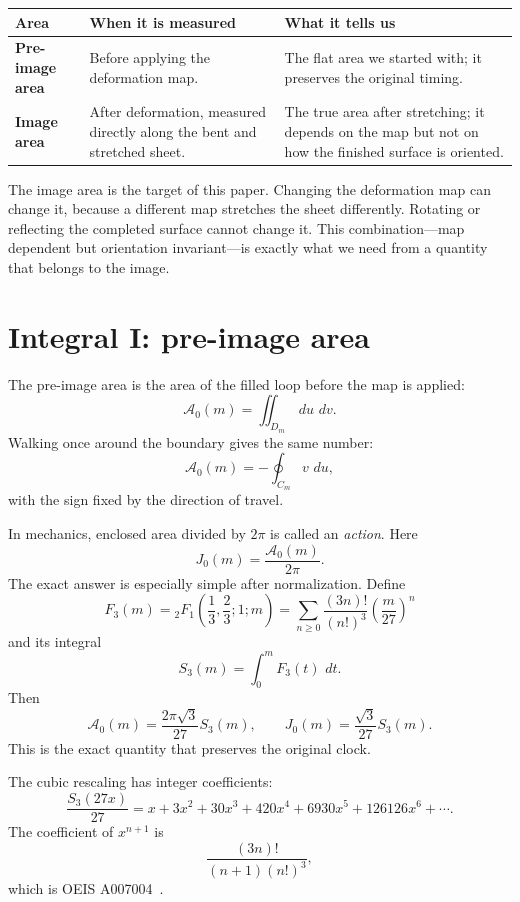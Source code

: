 \documentclass[11pt]{article}
\newcommand{\dd}{\,d}
\begin{document}
\begin{center}
\renewcommand{\arraystretch}{1.25}
\begin{tabularx}{0.98\textwidth}{>{\bfseries}p{}X X}
\toprule
Area & When it is measured & What it tells us\\
\midrule
Pre-image area
& Before applying the deformation map.
& The flat area we started with; it preserves the original timing.\\
Image area
& After deformation, measured directly along the bent and stretched sheet.
& The true area after stretching; it depends on the map but not on how the finished surface is oriented.\\
\bottomrule
\end{tabularx}
\end{center}

The image area is the target of this paper. Changing the deformation map can
change it, because a different map stretches the sheet differently. Rotating
or reflecting the completed surface cannot change it. This combination---map
dependent but orientation invariant---is exactly what we need from a quantity
that belongs to the image.

\section{Integral I: pre-image area}

The pre-image area is the area of the filled loop before the map is applied:
\[
\mathcal A_0(m)=\iint_{D_m}\dd u\,\dd v.
\]
Walking once around the boundary gives the same number:
\[
\mathcal A_0(m)=-\oint_{C_m}v\,\dd u,
\]
with the sign fixed by the direction of travel.

In mechanics, enclosed area divided by $2\pi$ is called an \emph{action}. Here
\[
J_0(m)=\frac{\mathcal A_0(m)}{2\pi}.
\]
The exact answer is especially simple after normalization. Define
\[
F_3(m)={}_2F_1\!\left(\frac13,\frac23;1;m\right)
=\sum_{n\geq0}\frac{(3n)!}{(n!)^3}\left(\frac{m}{27}\right)^n
\]
and its integral
\[
S_3(m)=\int_0^m F_3(t)\,\dd t.
\]
Then
\[
\boxed{
\mathcal A_0(m)=\frac{2\pi\sqrt3}{27}S_3(m),
\qquad
J_0(m)=\frac{\sqrt3}{27}S_3(m).}
\]
This is the exact quantity that preserves the original clock.

The cubic rescaling has integer coefficients:
\[
\frac{S_3(27x)}{27}
=x+3x^2+30x^3+420x^4+6930x^5+126126x^6+\cdots.
\]
The coefficient of $x^{n+1}$ is
\[
\frac{(3n)!}{(n+1)(n!)^3},
\]
which is OEIS A007004~\cite{oeis7004}.
\end{document}
